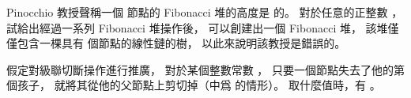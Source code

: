 \startsection[
  title={Bounding the maximum degree},
]

\startEXERCISE
Pinocchio 教授聲稱一個  節點的 Fibonacci 堆的高度是  的。
對於任意的正整數 ，
試給出經過一系列 Fibonacci 堆操作後，
可以創建出一個 Fibonacci 堆，
該堆僅僅包含一棵具有  個節點的線性鏈的樹，
以此來說明該教授是錯誤的。
\stopEXERCISE

\startANSWER
{}
\stopANSWER

\startEXERCISE
假定對級聯切斷操作進行推廣，
對於某個整數常數 ，
只要一個節點失去了他的第  個孩子，
就將其從他的父節點上剪切掉（ 中爲  的情形）。
  取什麼值時，有 。
\stopEXERCISE

\startANSWER
{}
\stopANSWER

\stopsection
